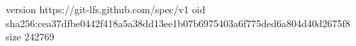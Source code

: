 version https://git-lfs.github.com/spec/v1
oid sha256:cea37dfbe0442f418a5a38dd13ee1b07b6975403a6f775ded6a804d40d2675f8
size 242769

